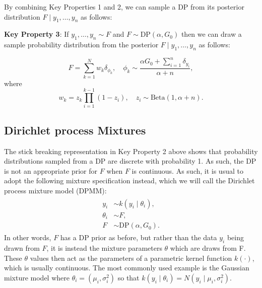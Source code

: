 \documentclass[nojss]{jss}
\begin{document}
By combining Key Properties 1 and 2, we can sample a DP from its posterior distribution $F \mid y_1,\ldots,y_n$ as follows:

\begin{tcolorbox}

\textbf{Key Property 3}:  If $y_1,\ldots,y_n \sim F$ and $F \sim \text{DP} (\alpha, G_0)$ then we can draw a sample probability distribution from the posterior $F\mid y_1,\ldots,y_n$ as follows:

$$F = \sum_{k=1}^N w_k \delta_{\phi_k}, \quad \phi_k \sim \frac{\alpha G_0 + \sum_{i=1}^n \delta_{y_i}}{\alpha+n},$$
where
$$w_k = z_k \prod_{i=1}^{k-1} (1-z_i),\quad z_i \sim \text{Beta}(1,\alpha+n).$$

\end{tcolorbox}




\subsection{Dirichlet process Mixtures} \label{subsec:dpm}
The stick breaking representation in Key Property 2 above shows that  probability distributions sampled from a DP are discrete with probability 1. As such, the DP is not an appropriate prior for $F$ when $F$ is continuous. As such, it is usual to adopt the following mixture specification instead, which we will call the Dirichlet process mixture model (DPMM):
\begin{align}
\begin{split}
y_i &\sim k(y_i \mid \theta_i), \\
\theta_i &\sim F, \\
F &\sim \text{DP} (\alpha, G_0).
\end{split}
\label{eqn:dpmm}
\end{align}
In other words, $F$ has a DP prior as before, but rather than the data $y_i$ being drawn from $F$, it is instead the mixture parameters $\theta$ which are draws from F.  These $\theta$ values then act as the parameters of a parametric kernel function $k(\cdot)$, which is usually continuous. The most commonly used example is the Gaussian mixture model where $\theta_i = (\mu_i,\sigma^2_i)$ so that $k(y_i \mid \theta_i) = N(y_i \mid \mu_i,\sigma^2_i)$.
\end{document}
